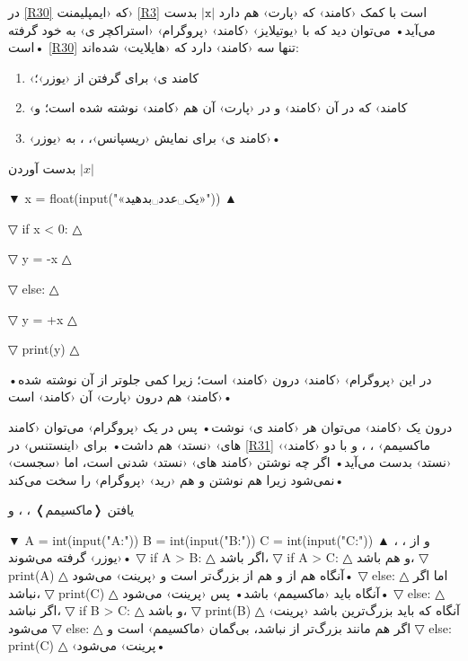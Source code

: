 \documentclass[openany, twocolumn]{book}
\begin{document}
در \ref{R30} که ‹ایمپلیمنت› \ref{R3} است با کمک ‹کامند›  که ‹پارت›  هم دارد $\left|\mathtt{x}\right|$ بدست می‌آید• می‌توان دید که با ‹یوتیلایز› ‹کامند›  ‹پروگرام› ‹استراکچر ی› به خود گرفته است• \ref{R30} تنها سه ‹کامند› دارد که ‹هایلایت› شده‌اند:
\begin{enumerate}
\item ‹کامند ی› برای گرفتن  از ‹یوزر›؛
\item ‹کامند›  که در آن ‹کامند›  و در ‹پارت›  آن هم ‹کامند›  نوشته شده است؛ و
\item ‹کامند ی› برای نمایش ‹ریسپانس›، ، به ‹یوزر›•
\end{enumerate}
\begin{Program}
\caption{بدست آوردن $\left|x\right|$\label{R30}}

\begin{structure}
▼
x = float(input("«یک␣عدد␣بدهید»"))
▲
\end{structure}
\begin{structure}
▽
if x < 0:
△
\begin{structure}
▽
y = -x
△
\end{structure}
▽
else:
△
\begin{structure}
▽
y = +x
△
\end{structure}
\end{structure}
\begin{structure}
▽
print(y)
△
\end{structure}
در این ‹پروگرام› ‹کامند›  درون ‹کامند›  است؛ زیرا کمی جلو‌تر از آن نوشته شده• ‹کامند›  هم درون ‹پارت›  آن ‹کامند›  است•
\end{Program}

درون یک ‹کامند›  می‌توان هر ‹کامند ی› نوشت• پس در یک ‹پروگرام› می‌توان ‹کامند های›  ‹نستد› هم داشت• برای ‹اینستنس› در \ref{R31} ‹ماکسیمم› ، ، و  با دو ‹کامند›  ‹نستد› بدست می‌آید• اگر چه نوشتن ‹کامند های›  ‹نستد› شدنی است، اما ‹سجست› نمی‌شود زیرا هم نوشتن و هم ‹رید› ‹پروگرام› را سخت می‌کند•

\begin{Program}
\caption{یافتن ❬ماکسیمم❭ ، ، و \label{R31}}

▼
A = int(input("A:"))
B = int(input("B:"))
C = int(input("C:"))
▲
 ، ، و  از ‹یوزر› گرفته می‌شوند• 
▽
if A > B:
△
 اگر  باشد، 
▽
	if A > C:
△
 و  هم باشد، 
▽
		print(A)
△
 آنگاه  هم از  و هم از  بزرگ‌تر است و ‹پرینت› می‌شود• 
▽
	else:
△
 اما اگر  نباشد، 
▽
		print(C)
△
 آنگاه باید  ‹ماکسیمم› باشد• پس  ‹پرینت› می‌شود• 
▽
else:
△
 اگر  نباشد، 
▽
	if B > C:
△
 و  باشد، 
▽
		print(B)
△
 آنگاه  که باید بزرگ‌ترین باشد ‹پرینت› می‌شود 
▽
	else:
△
 اگر  هم مانند  بزرگ‌تر از  نباشد، بی‌گمان  ‹ماکسیمم› است و 
▽
	else:
		print(C)
△
 ‹پرینت› می‌شود•
\end{Program}
\end{document}
